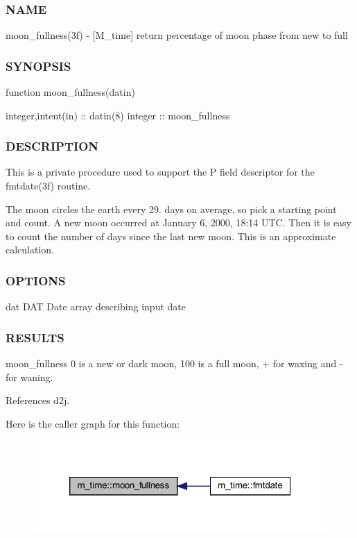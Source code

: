 \begin{DoxyVerb}
\subsubsection*{N\+A\+ME}

moon\+\_\+fullness(3f) -\/ \mbox{[}M\+\_\+time\mbox{]} return percentage of moon phase from new to full \subsubsection*{S\+Y\+N\+O\+P\+S\+IS}

function moon\+\_\+fullness(datin)

integer,intent(in) \+:\+: datin(8) integer \+:\+: moon\+\_\+fullness

\subsubsection*{D\+E\+S\+C\+R\+I\+P\+T\+I\+ON}

This is a private procedure used to support the P field descriptor for the fmtdate(3f) routine.

The moon circles the earth every 29. days on average, so pick a starting point and count. A new moon occurred at January 6, 2000, 18\+:14 U\+TC. Then it is easy to count the number of days since the last new moon. This is an approximate calculation.

\subsubsection*{O\+P\+T\+I\+O\+NS}

dat D\+AT Date array describing input date

\subsubsection*{R\+E\+S\+U\+L\+TS}

moon\+\_\+fullness 0 is a new or dark moon, 100 is a full moon, + for waxing and -\/ for waning. 

References d2j.

Here is the caller graph for this function\+:
\nopagebreak
\begin{figure}[H]
\begin{center}
\leavevmode
\includegraphics[width=320pt]{namespacem__time_a702b39998a769b8f60070c0bec975ee2_icgraph}
\end{center}
\end{figure}
\mbox{\label{namespacem__time_a6b5e87be0e510ff268c1ecfbf67a3bdb}} 

\end{DoxyVerb}
